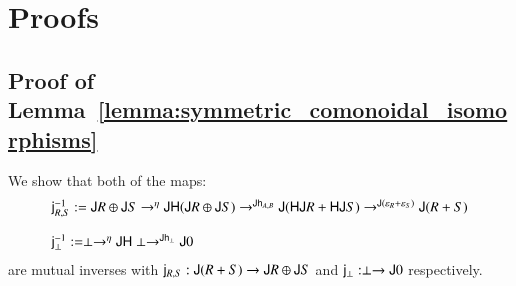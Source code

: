 \section{Proofs}
\label{sec:proofs}

\subsection{Proof of Lemma~\ref{lemma:symmetric_comonoidal_isomorphisms}}
\label{subsec:proof_of_lemma:symmetric_comonoidal_isomorphisms}
We show that both of the  maps:
\[
  \begin{array}{lll}
    \mathsf{j}^{-1}_{R,S} := \mathsf{J}R \oplus \mathsf{J}S \rightarrow^{\eta} \mathsf{JH}(\mathsf{J}R \oplus \mathsf{J}S) \rightarrow^{\mathsf{J}\mathsf{h}_{A,B}} \mathsf{J}(\mathsf{HJ}R + \mathsf{HJ}S) \rightarrow^{\mathsf{J}(\varepsilon_R + \varepsilon_S)} \mathsf{J}(R + S)\\
  \\
  \mathsf{j}^{-1}_{\perp} := \perp \rightarrow^{\eta} \mathsf{JH}\perp \rightarrow^{\mathsf{J}\mathsf{h}_{\perp}} \mathsf{J}0
  \end{array}
  \]
are mutual inverses with $\mathsf{j}_{R,S} : \mathsf{J}(R + S) \rightarrow \mathsf{J}R
\oplus \mathsf{J}S$ and $\mathsf{j}_{\perp} : \perp \rightarrow \mathsf{J}0$ respectively.

